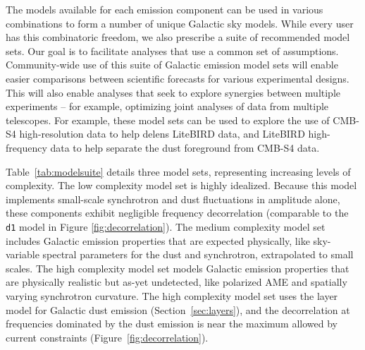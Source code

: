 \documentclass[twocolumn]{aastex631}
\begin{document}
The models available for each emission component can be used in various combinations to form a number of unique Galactic sky models. While every user has this combinatoric freedom, we also prescribe a suite of recommended model sets. Our goal is to facilitate analyses that use a common set of assumptions. Community-wide use of this suite of Galactic emission model sets will enable easier comparisons between scientific forecasts for various experimental designs. This will also enable analyses that seek to explore synergies between multiple experiments -- for example, optimizing joint analyses of data from multiple telescopes. For example, these model sets can be used to explore the use of CMB-S4 high-resolution data to help delens LiteBIRD data, and LiteBIRD high-frequency data to help separate the dust foreground from CMB-S4 data. 


Table~\ref{tab:modelsuite} details three model sets, representing increasing levels of complexity. The low complexity model set is highly idealized. Because this model implements small-scale synchrotron and dust fluctuations in amplitude alone, these components exhibit negligible frequency decorrelation (comparable to the \texttt{d1} model in Figure \ref{fig:decorrelation}).  
The medium complexity model set includes Galactic emission properties that are expected physically, %
like sky-variable spectral parameters for the dust and synchrotron, extrapolated to small scales. 
The high complexity model set models Galactic emission properties that are physically realistic but as-yet undetected, like polarized AME and spatially varying synchrotron curvature. The high complexity model set uses the layer model for Galactic dust emission (Section~\ref{sec:layers}), and the decorrelation at frequencies dominated by the dust emission is near the maximum allowed by current constraints (Figure~\ref{fig:decorrelation}).

\end{document}
